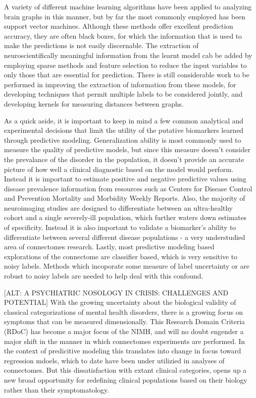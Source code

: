 A variety of different machine learning algorithms have been applied to analyzing brain graphs in this manner,
but by far the most commonly employed has been support vector machines\cite{DiMartino}. Although these methods 
offer excellent prediction accuracy, they are often black boxes, for which the information that is used to make the
predictions is not easily discernable. The extraction of neuroscientifically
meaningful information from the learnt model cab be added by employing sparse methods and feature
selection to reduce the input variables to only those that are
essential for prediction.  There is still considerable work to be performed in
improving the extraction of information from these models, for developing
techniques that permit multiple labels to be considered jointly, and developing
kernels for measuring distances between graphs.


As a quick aside, it is important to keep in mind a few common analytical and experimental decisions that 
limit the utility of the putative biomarkers learned through predictive modeling. Generalization ability is
most commonly used to measure the quality of predictive models, but since this measure doesn't consider the
prevalance of the disorder in the population, it doesn't provide an accurate picture of how well a clinical 
diagnostic based on the model would perform. Instead it is important to estimate positive and negative predictive 
values \cite{Grimes, Altman} using disease prevalence information from resources such as Centers for Disease Control and 
Prevention Mortality and Morbidity Weekly Reports. Also, the majority of neuroimaging studies are designed to 
differentiate between an ultra-healthy cohort and a single severely-ill population, which further waters down
estimates of specificity. Instead it is also important to validate a biomarker's ability to differentiate between
several different disease populations - a very understudied area of connectomes research. Lastly, most predictive
modeling based explorations of the connectome are classifier based, which is very sensitive to noisy labels. Methods 
which incoporate some measure of label uncertainty or are robust to noisy labels are needed to help deal with this confound.


 [ALT: A PSYCHIATRIC NOSOLOGY IN CRISIS: CHALLENGES AND POTENTIAL]
With the growing uncertainty about the biological validity of classical categorizations
of mental health disorders, there is a growing focus on symptoms that can be measured dimensionally. This 
Research Domain Criteria (RDoC) has become a major focus of the NIMH, and will no doubt engender a major shift in the 
manner in which connectomes experiments are performed. In the context of predicitive modeling this translates into change in
focus toward regression mdoels, which to date have been under utilizied in analyses of connectomes. But this dissatisfaction
with extant clinical categories, opens up a new broad opportunity for redefining clinical populations based on their 
biology rather than their symptomatology.

